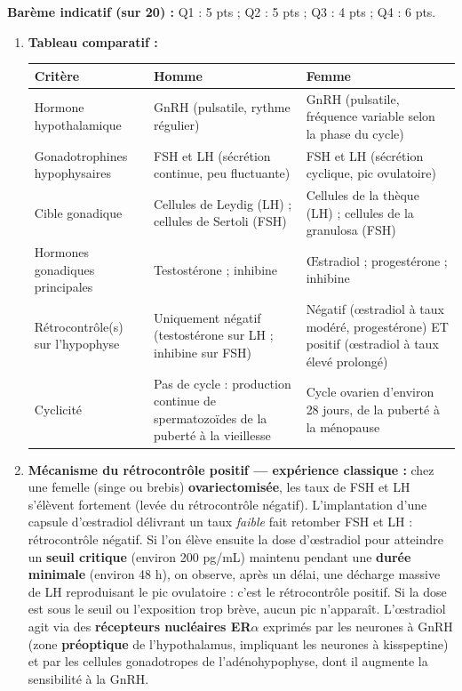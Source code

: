 \documentclass[11pt]{article}
\begin{document}
\begin{corrige}
\textbf{Barème indicatif (sur 20) :} Q1 : 5 pts ; Q2 : 5 pts ; Q3 : 4 pts ; Q4 : 6 pts.
\begin{enumerate}
    \item \textbf{Tableau comparatif :}
\begin{center}
\begin{tabularx}{\linewidth}{|l|X|X|}\hline
\rowcolor{popblueL} \textbf{Critère} & \textbf{Homme} & \textbf{Femme} \\ \hline
Hormone hypothalamique & GnRH (pulsatile, rythme régulier) & GnRH (pulsatile, fréquence variable selon la phase du cycle) \\ \hline
Gonadotrophines hypophysaires & FSH et LH (sécrétion continue, peu fluctuante) & FSH et LH (sécrétion cyclique, pic ovulatoire) \\ \hline
Cible gonadique & Cellules de Leydig (LH) ; cellules de Sertoli (FSH) & Cellules de la thèque (LH) ; cellules de la granulosa (FSH) \\ \hline
Hormones gonadiques principales & Testostérone ; inhibine & Œstradiol ; progestérone ; inhibine \\ \hline
Rétrocontrôle(s) sur l'hypophyse & Uniquement négatif (testostérone sur LH ; inhibine sur FSH) & Négatif (œstradiol à taux modéré, progestérone) ET positif (œstradiol à taux élevé prolongé) \\ \hline
Cyclicité & Pas de cycle : production continue de spermatozoïdes de la puberté à la vieillesse & Cycle ovarien d'environ 28 jours, de la puberté à la ménopause \\ \hline
\end{tabularx}
\end{center}
    \item \textbf{Mécanisme du rétrocontrôle positif — expérience classique :} chez une femelle (singe ou brebis) \textbf{ovariectomisée}, les taux de FSH et LH s'élèvent fortement (levée du rétrocontrôle négatif). L'implantation d'une capsule d'œstradiol délivrant un taux \emph{faible} fait retomber FSH et LH : rétrocontrôle négatif. Si l'on élève ensuite la dose d'œstradiol pour atteindre un \textbf{seuil critique} (environ 200 pg/mL) maintenu pendant une \textbf{durée minimale} (environ 48 h), on observe, après un délai, une décharge massive de LH reproduisant le pic ovulatoire : c'est le rétrocontrôle positif. Si la dose est sous le seuil ou l'exposition trop brève, aucun pic n'apparaît. L'œstradiol agit via des \textbf{récepteurs nucléaires ER$\alpha$} exprimés par les neurones à GnRH (zone \textbf{préoptique} de l'hypothalamus, impliquant les neurones à kisspeptine) et par les cellules gonadotropes de l'adénohypophyse, dont il augmente la sensibilité à la GnRH.

\end{enumerate}
\end{corrige}
\end{document}
